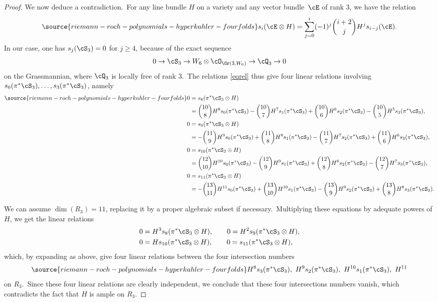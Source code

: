\begin{proof}
We now deduce a contradiction.\
For any line bundle $H$ on a variety and any vector bundle~$\cE$ of rank $3$, we have the relation
\begin{eqnarray}\label{eqrel}
\source{riemann-roch-polynomials-hyperkahler-fourfolds}
s_i(\cE\otimes H)=\sum_{j=0}^i (-1)^j \binom{i+2}{j} H^js_{i-j}(\cE).
\end{eqnarray}
In our case, one has $s_j(\cS_3)=0$ for $j\geq 4$, because of the exact sequence
\[
0\to   \cS_3\to  W_6\otimes \cO_{\Gr(3,W_6)}\to  \cQ_3\to  0
\]
on the Grassmannian, where $\cQ_3$ is locally free of rank $3$.\
The relations \eqref{eqrel}  thus give four linear relations involving  $s_0(\pi^* \cS_3),\ldots, s_3( \pi^* \cS_3)$, namely
\begin{align*}\label{eqrelexpl}
\source{riemann-roch-polynomials-hyperkahler-fourfolds}
  0&=s_8(\pi^* \cS_3\otimes H  )\nonumber\\
  &= \binom{10}{8}H^8s_0(\pi^* \cS_3)-\binom{10}{7}H^7s_1(\pi^* \cS_3)+\binom{10}{6}H^6 s_2(\pi^* \cS_3)-\binom{10}{5}H^5s_3(\pi^* \cS_3),\\
  \nonumber
 0&=s_9(\pi^* \cS_3\otimes H  )\\
 &= -  \binom{11}{9}H^9s_0(\pi^* \cS_3)+\binom{11}{8}H^8s_1(\pi^* \cS_3)-\binom{11}{7}H^7s_2(\pi^* \cS_3)+\binom{11}{6}H^6s_3(\pi^* \cS_3), \\
  \nonumber
 0&=s_{10} (\pi^* \cS_3\otimes H  )\\
 &=\binom{12}{10}H^{10}s_0(\pi^* \cS_3)-\binom{12}{9}H^9s_1(\pi^* \cS_3)+\binom{12}{8}H^8s_2(\pi^* \cS_3)-\binom{12}{7}H^7s_3(\pi^* \cS_3), \\
  \nonumber
 0&=s_{11} (\pi^* \cS_3\otimes H  )\\
 &=-\binom{13}{11}H^{11}s_0(\pi^* \cS_3)+\binom{13}{10}H^{10}s_1(\pi^* \cS_3)-\binom{13}{9}H^9s_2(\pi^* \cS_3)+\binom{13}{8}H^8s_3(\pi^* \cS_3).
\end{align*}

We can assume $\dim(R_3)=11$, replacing it by a proper algebraic subset if necessary.\
Multiplying these equations by   adequate powers of $H$, we get the linear relations
\begin{equation*}
\begin{split}
& 0=H^3s_8(\pi^* \cS_3\otimes H),\qquad 0=H^2s_9(\pi^* \cS_3\otimes H  ),\\
& 0=H s_{10} (\pi^* \cS_3\otimes H  ),\qquad 0=s_{11} (\pi^* \cS_3\otimes H),
\end{split}
\end{equation*}
which, by expanding as above,  give four linear relations between the four intersection numbers
\begin{equation*} \label{eqnumbers}
\source{riemann-roch-polynomials-hyperkahler-fourfolds}
H^8s_3(\pi^* \cS_3),\ H^9s_2(\pi^* \cS_3),\ H^{10}s_1(\pi^* \cS_3), \ H^{11}
\end{equation*}
on $R_3$.\
Since these four  linear relations are clearly independent, we conclude that these four intersections numbers vanish, which contradicts the fact that $H$ is ample on $R_3$.
\end{proof}


